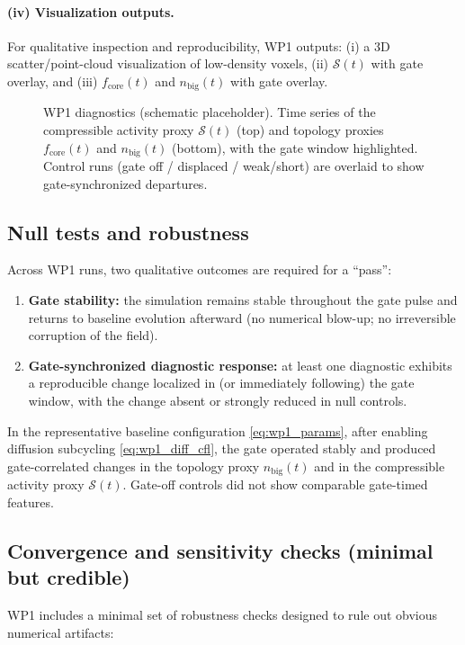 \documentclass[11pt]{article}
\theoremstyle{plain}
\theoremstyle{definition}
\theoremstyle{remark}
\begin{document}
\paragraph{(iv) Visualization outputs.}
For qualitative inspection and reproducibility, WP1 outputs:
(i) a 3D scatter/point-cloud visualization of low-density voxels,
(ii) $\mathcal{S}(t)$ with gate overlay, and
(iii) $f_{\text{core}}(t)$ and $n_{\text{big}}(t)$ with gate overlay.

\begin{figure}[t]
  \centering
  \caption{WP1 diagnostics (schematic placeholder). Time series of the compressible activity proxy
  $\mathcal{S}(t)$ (top) and topology proxies $f_{\text{core}}(t)$ and $n_{\text{big}}(t)$ (bottom),
  with the gate window highlighted. Control runs (gate off / displaced / weak/short) are overlaid to
  show gate-synchronized departures.}
  \label{fig:wp1_timeseries}
\end{figure}

\subsection{Null tests and robustness}\label{sec:wp1_nulls}
Across WP1 runs, two qualitative outcomes are required for a ``pass'':

\begin{enumerate}[leftmargin=*]
  \item \textbf{Gate stability:} the simulation remains stable throughout the gate pulse and returns to
  baseline evolution afterward (no numerical blow-up; no irreversible corruption of the field).
  \item \textbf{Gate-synchronized diagnostic response:} at least one diagnostic exhibits a reproducible
  change localized in (or immediately following) the gate window, with the change absent or strongly
  reduced in null controls.
\end{enumerate}

In the representative baseline configuration \eqref{eq:wp1_params}, after enabling diffusion subcycling
\eqref{eq:wp1_diff_cfl}, the gate operated stably and produced gate-correlated changes in the topology
proxy $n_{\text{big}}(t)$ and in the compressible activity proxy $\mathcal{S}(t)$. Gate-off controls did
not show comparable gate-timed features.

\subsection{Convergence and sensitivity checks (minimal but credible)}\label{sec:wp1_convergence}
WP1 includes a minimal set of robustness checks designed to rule out obvious numerical artifacts:
\end{document}
